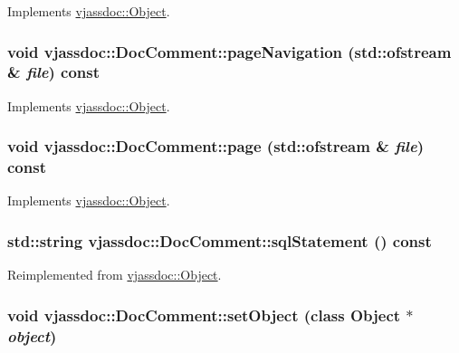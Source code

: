 Implements \hyperlink{classvjassdoc_1_1Object_bd43e77dbe80055f5adda67661dfaca4}{vjassdoc::Object}.\hypertarget{classvjassdoc_1_1DocComment_2a0b017c17c8a20679b2052b87a74c15}{
\subsubsection{\setlength{\rightskip}{0pt plus 5cm}void vjassdoc::DocComment::pageNavigation (std::ofstream \& {\em file}) const}}
\label{classvjassdoc_1_1DocComment_2a0b017c17c8a20679b2052b87a74c15}




Implements \hyperlink{classvjassdoc_1_1Object_736bbb6719edd8070d8f56c364a2764c}{vjassdoc::Object}.\hypertarget{classvjassdoc_1_1DocComment_79dd94421713887af6028f49736d895d}{
\subsubsection{\setlength{\rightskip}{0pt plus 5cm}void vjassdoc::DocComment::page (std::ofstream \& {\em file}) const}}
\label{classvjassdoc_1_1DocComment_79dd94421713887af6028f49736d895d}




Implements \hyperlink{classvjassdoc_1_1Object_a0489e38956f3507566b1bc6e3e2c8af}{vjassdoc::Object}.\hypertarget{classvjassdoc_1_1DocComment_d50177b6a9bd805ebe1ef76b8607242e}{
\subsubsection{\setlength{\rightskip}{0pt plus 5cm}std::string vjassdoc::DocComment::sqlStatement () const}}
\label{classvjassdoc_1_1DocComment_d50177b6a9bd805ebe1ef76b8607242e}




Reimplemented from \hyperlink{classvjassdoc_1_1Object_4e8ebbb0ce5b0bf91ec847b1e4a9f8fc}{vjassdoc::Object}.\hypertarget{classvjassdoc_1_1DocComment_486dc09c43432be8e8285716aad13607}{
\subsubsection{\setlength{\rightskip}{0pt plus 5cm}void vjassdoc::DocComment::setObject (class {\bf Object} $\ast$ {\em object})}}
\label{classvjassdoc_1_1DocComment_486dc09c43432be8e8285716aad13607}


